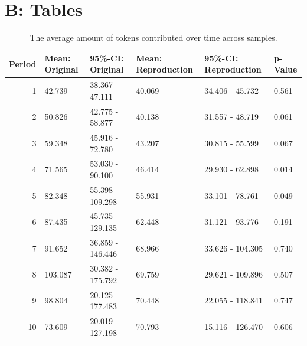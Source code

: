 \documentclass[
  authoryear,
  review,
  3p,
  onecolumn]{elsarticle}
\begin{document}
\newpage{}

\hypertarget{b-tables}{%
\section{B: Tables}\label{b-tables}}

\hypertarget{tbl-contribution-periods}{}
\begin{table}
\caption{\label{tbl-contribution-periods}The average amount of tokens contributed over time across samples. }\tabularnewline

\centering
\begin{tabular}{r|l|l|l|l|l}
\hline
Period & Mean: Original & 95\%-CI: Original & Mean: Reproduction & 95\%-CI: Reproduction & p-Value\\
\hline
1 & 42.739 & 38.367 - 47.111 & 40.069 & 34.406 - 45.732 & 0.561\\
\hline
2 & 50.826 & 42.775 - 58.877 & 40.138 & 31.557 - 48.719 & 0.061\\
\hline
3 & 59.348 & 45.916 - 72.780 & 43.207 & 30.815 - 55.599 & 0.067\\
\hline
4 & 71.565 & 53.030 - 90.100 & 46.414 & 29.930 - 62.898 & 0.014\\
\hline
5 & 82.348 & 55.398 - 109.298 & 55.931 & 33.101 - 78.761 & 0.049\\
\hline
6 & 87.435 & 45.735 - 129.135 & 62.448 & 31.121 - 93.776 & 0.191\\
\hline
7 & 91.652 & 36.859 - 146.446 & 68.966 & 33.626 - 104.305 & 0.740\\
\hline
8 & 103.087 & 30.382 - 175.792 & 69.759 & 29.621 - 109.896 & 0.507\\
\hline
9 & 98.804 & 20.125 - 177.483 & 70.448 & 22.055 - 118.841 & 0.747\\
\hline
10 & 73.609 & 20.019 - 127.198 & 70.793 & 15.116 - 126.470 & 0.606\\
\hline
\end{tabular}
\end{table}
\end{document}
